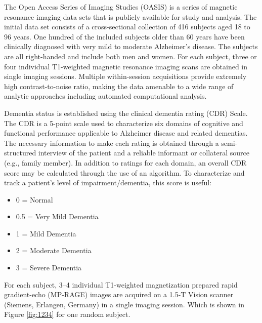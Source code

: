 The Open Access Series of Imaging Studies (OASIS) is a series of magnetic  resonance  imaging  data  sets  that  is  publicly  available  for study and analysis. The initial data set consists of a cross-sectional collection of 416 subjects aged 18 to 96 years. One hundred of the  included  subjects  older  than  60  years  have  been  clinically diagnosed with very mild to moderate Alzheimer’s disease. The subjects are all right-handed and include both men and women. For each subject, three or four individual T1-weighted magnetic
resonance imaging scans are obtained in single imaging sessions. Multiple within-session acquisitions provide extremely high contrast-to-noise ratio, making the data amenable to a wide range of analytic approaches including automated computational analysis.

Dementia  status  is  established using  the
clinical dementia rating (CDR) Scale. The CDR is a 5-point scale used to characterize six domains of cognitive and functional performance applicable to Alzheimer disease and related dementias. The necessary information to make each rating is obtained through a semi-structured interview of the patient and a reliable informant or collateral source (e.g., family member). In addition to ratings for each domain, an overall CDR score may be calculated through the use of an algorithm. To characterize and track a patient's level of impairment/dementia, this score is useful:

\begin{itemize}
	\item 0 = Normal
	\item 0.5 = Very Mild Dementia
	\item 1 = Mild Dementia
	\item 2 = Moderate Dementia
	\item 3 = Severe Dementia
\end{itemize}

For  each  subject,  3–4  individual  T1-weighted  magnetization  prepared  rapid  gradient-echo  (MP-RAGE)  images are  acquired  on a  1.5-T  Vision  scanner (Siemens,  Erlangen,  Germany) in  a single  imaging  session. Which is shown in Figure \ref{fig:1234} for one random subject.


